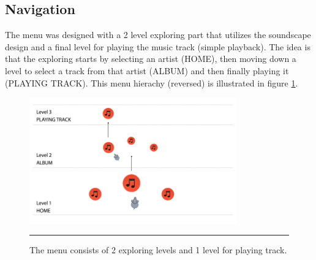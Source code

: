 \subsection{Navigation}
The menu was designed with a 2 level exploring part that utilizes the soundscape design and a final level for playing the music track (simple playback). The idea is that the exploring starts by selecting an artist (HOME), then moving down a level to select a track from that artist (ALBUM) and then finally playing it (PLAYING TRACK). This menu hierachy (reversed) is illustrated in figure \ref{fig:navigation}.

\begin{figure}[b]
	\centering
		\includegraphics[width=0.8\textwidth,height=\textheight,keepaspectratio]{./Figures/navigation.png}
		\rule{35em}{0.5pt}
	\caption[Menu Hierachy]{The menu consists of 2 exploring levels and 1 level for playing track.}
	\label{fig:navigation}
\end{figure}

